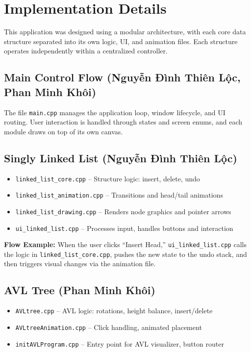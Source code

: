 
\section{Implementation Details}
\begin{flushleft}
    

This application was designed using a modular architecture, with each core data structure separated into its own logic, UI, and animation files. Each structure operates independently within a centralized controller.

\subsection*{Main Control Flow (Nguyễn Đình Thiên Lộc, Phan Minh Khôi)}

The file \texttt{main.cpp} manages the application loop, window lifecycle, and UI routing. User interaction is handled through states and screen enums, and each module draws on top of its own canvas.

\subsection*{Singly Linked List (Nguyễn Đình Thiên Lộc)}

\begin{itemize}
    \item \texttt{linked\_list\_core.cpp} – Structure logic: insert, delete, undo
    \item \texttt{linked\_list\_animation.cpp} – Transitions and head/tail animations
    \item \texttt{linked\_list\_drawing.cpp} – Renders node graphics and pointer arrows
    \item \texttt{ui\_linked\_list.cpp} – Processes input, handles buttons and interaction
\end{itemize}

\textbf{Flow Example:} When the user clicks “Insert Head,” \texttt{ui\_linked\_list.cpp} calls the logic in \texttt{linked\_list\_core.cpp}, pushes the new state to the undo stack, and then triggers visual changes via the animation file.

\subsection*{AVL Tree (Phan Minh Khôi)}

\begin{itemize}
    \item \texttt{AVLtree.cpp} – AVL logic: rotations, height balance, insert/delete
    \item \texttt{AVLtreeAnimation.cpp} – Click handling, animated placement
    \item \texttt{initAVLProgram.cpp} – Entry point for AVL visualizer, button router
\end{itemize}


\end{flushleft}
